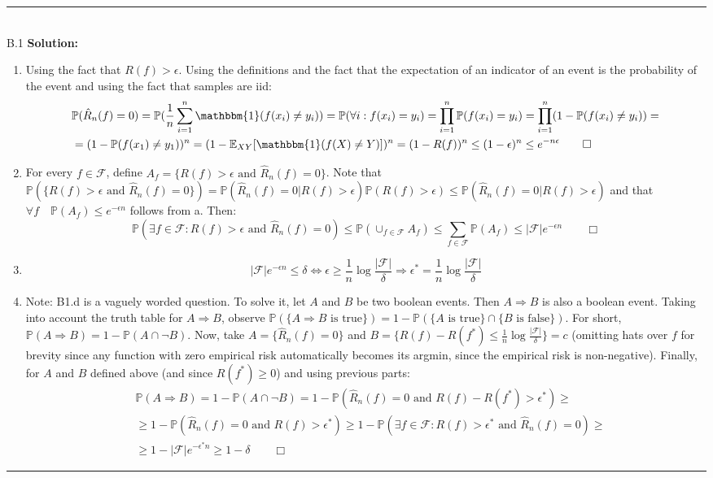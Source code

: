 \documentclass{article}
\newcommand{\1}{\mathbf{1}}
\newcommand{\I}{\mathbbm{1}}
\newcommand{\E}{\mathbb{E}}
\renewcommand{\P}{\mathbb{P}}
\begin{document}
\noindent\rule{\textwidth}{1pt}
\\
B.1 {\bf Solution:}\\
\begin{enumerate}
    \item Using the fact that $R(f) > \epsilon$. Using the definitions and the fact that the expectation of an indicator of an event is the probability of the event and using the fact that samples are iid:
    \begin{align}
    & \P(\hat{R}_n(f) = 0) = \P(\frac{1}{n}\sum_{i=1}^n \I(f(x_i) \not = y_i)) = \P(\forall i: f(x_i) = y_i) = \prod_{i=1}^n \P(f(x_i)=y_i) =  \prod_{i=1}^n (1-\P(f(x_i)\not = y_i)) =  \\
    &= (1-\P(f(x_1)\not = y_1))^n = (1 - \E_{XY}[\I(f(X) \not = Y)])^n = (1 - R(f))^n \le (1-\epsilon)^n \le e^{-n\epsilon} \qquad \Box
    \end{align}
    \item For every $f \in \mathcal{F}$, define $A_f = \{R(f)>\epsilon \text{ and } \hat{R}_n(f) = 0 \}$. Note that $\P(\{R(f)>\epsilon \text{ and } \hat{R}_n(f) = 0 \}) = \P(\hat{R}_n(f) = 0|R(f)>\epsilon)\P(R(f)>\epsilon) \le \P(\hat{R}_n(f) = 0|R(f)>\epsilon)$ and that $\forall f \quad \P(A_f) \le e^{-\epsilon n}$ follows from a. Then:
    $$
    \P(\exists f \in \mathcal{F}: R(f) > \epsilon \text{ and } \hat{R}_n(f) = 0) \le \P(\cup_{f \in \mathcal{F}} A_f) \le \sum_{f \in \mathcal{F}} \P(A_f) \le |\mathcal{F}|e^{-\epsilon n} \qquad \Box
    $$
    \item $$
    |\mathcal{F}|e^{-\epsilon n} \le \delta \Leftrightarrow \epsilon \ge \frac{1}{n}\log \frac{\mathcal{|F|}}{\delta} \Rightarrow \boxed{\epsilon^* = \frac{1}{n}\log \frac{\mathcal{|F|}}{\delta}}
    $$
    \item Note: B1.d is a vaguely worded question. To solve it, let $A$ and $B$ be two boolean events. Then $A \Rightarrow B$ is also a boolean event. Taking into account the truth table for $A \Rightarrow B$, observe $\P(\{A \Rightarrow B \text{ is true}\}) = 1 - \P(\{A \text{ is true}\}  \cap \{B  \text{ is false}\})$. For short,  $\P(A \Rightarrow B) = 1 - \P(A \cap \neg B)$. Now, take $A = \{\hat{R}_n(f) = 0\}$ and $B = \{R(f) - R(f^*) \le \frac{1}{n}\log \frac{\mathcal{|F|}}{\delta}\} =c $ (omitting hats over $f$ for brevity since any function with zero empirical risk automatically becomes its argmin, since the empirical risk is non-negative). Finally, for $A$ and $B$ defined above (and since $R(f^*) \ge 0$) and using previous parts:
    \begin{align}
        &\P(A \Rightarrow B) = 1 - \P(A \cap \neg B) = 1 - \P(\hat{R}_n(f) = 0 \text{ and } R(f) - R(f^*) > \epsilon^*) \ge \\
        & \ge 1 - \P(\hat{R}_n(f) = 0 \text{ and } R(f) > \epsilon^*) \ge
        1 - \P(\exists f \in \mathcal{F}: R(f) > \epsilon^* \text{ and } \hat{R}_n(f) = 0) \ge \\
        &\ge 1 - |\mathcal{F}|e^{-\epsilon^* n} \ge 1 - \delta \qquad \Box
    \end{align}
    \end{enumerate}   
\noindent\rule{\textwidth}{1pt}
\end{document}
